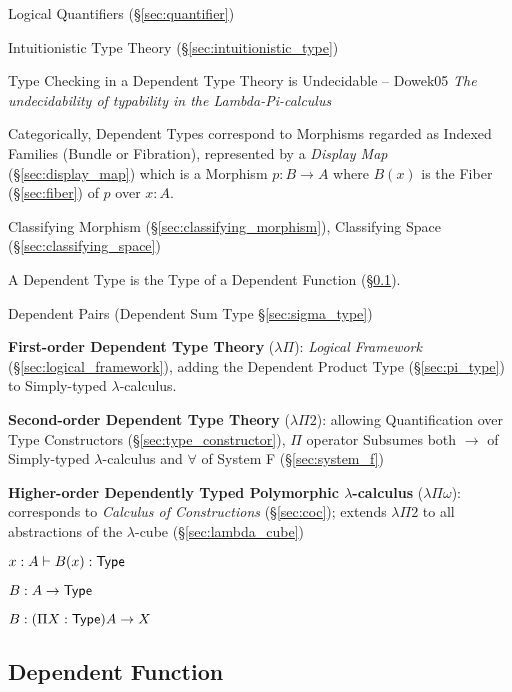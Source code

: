 Logical Quantifiers (\S\ref{sec:quantifier})

Intuitionistic Type Theory (\S\ref{sec:intuitionistic_type})

Type Checking in a Dependent Type Theory is Undecidable -- Dowek05
\emph{The undecidability of typability in the Lambda-Pi-calculus}

Categorically, Dependent Types correspond to Morphisms regarded as
Indexed Families (Bundle or Fibration), represented by a \emph{Display
  Map} (\S\ref{sec:display_map}) which is a Morphism $p : B
\rightarrow A$ where $B(x)$ is the Fiber (\S\ref{sec:fiber}) of $p$
over $x:A$.

Classifying Morphism (\S\ref{sec:classifying_morphism}),
Classifying Space (\S\ref{sec:classifying_space})

A Dependent Type is the Type of a Dependent Function
(\S\ref{sec:dependent_function}).

Dependent Pairs (Dependent Sum Type \S\ref{sec:sigma_type})


\textbf{First-order Dependent Type Theory} ($\lambda \Pi$):
\emph{Logical Framework} (\S\ref{sec:logical_framework}), adding the
Dependent Product Type (\S\ref{sec:pi_type}) to Simply-typed
$\lambda$-calculus.


\textbf{Second-order Dependent Type Theory} ($\lambda \Pi 2$):
allowing Quantification over Type Constructors
(\S\ref{sec:type_constructor}), $\Pi$ operator Subsumes both
$\rightarrow$ of Simply-typed $\lambda$-calculus and $\forall$ of
System F (\S\ref{sec:system_f})


\textbf{Higher-order Dependently Typed Polymorphic $\lambda$-calculus}
($\lambda \Pi \omega$): corresponds to \emph{Calculus of
  Constructions} (\S\ref{sec:coc}); extends $\lambda \Pi 2$ to all
abstractions of the $\lambda$-cube (\S\ref{sec:lambda_cube})


\asterism


$x:A \vdash B(x):\mathsf{Type}$

$B : A \rightarrow \mathsf{Type}$

$B : (\Pi X:\mathsf{Type}) A \rightarrow X$



\subsection{Dependent Function}\label{sec:dependent_function}

